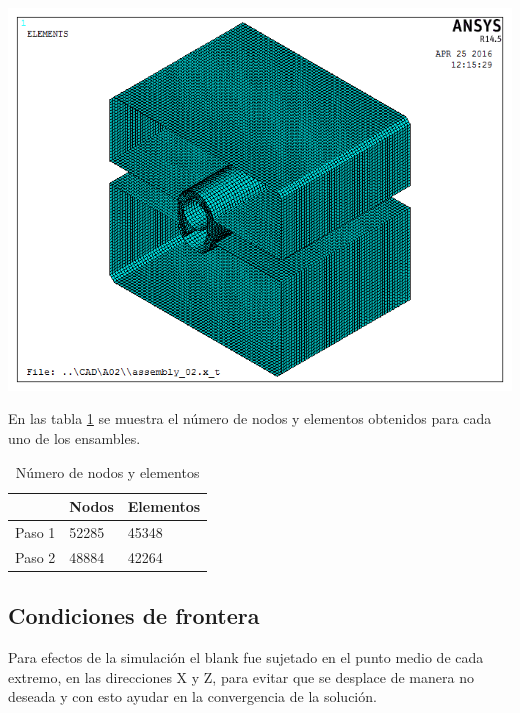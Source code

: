 \begin{center}
\includegraphics[scale=0.6]{src/ch3/mesh_assembly_02.png}
\label{fig:mesh_assembly02}
\end{center}

En las tabla \ref{tab:elements_and_nodes} se muestra el número de nodos y elementos obtenidos para cada uno de los 
ensambles.

\begin{table}[h]
\centering
\caption{Número de nodos y elementos}
\label{}
\begin{tabular}{p{2cm} p{2cm} p{2cm}} \hline
 & Nodos & Elementos \\
\hline
Paso 1 & 52285 & 45348 \\
Paso 2 & 48884 & 42264 \\
\hline
\end{tabular}
\label{tab:elements_and_nodes}
\end{table}


\subsection{Condiciones de frontera}

Para efectos de la simulación el blank fue sujetado en el punto medio de cada extremo, 
en las direcciones X y Z, para evitar que se desplace de manera no deseada y con esto 
ayudar en la convergencia de la solución.\\

